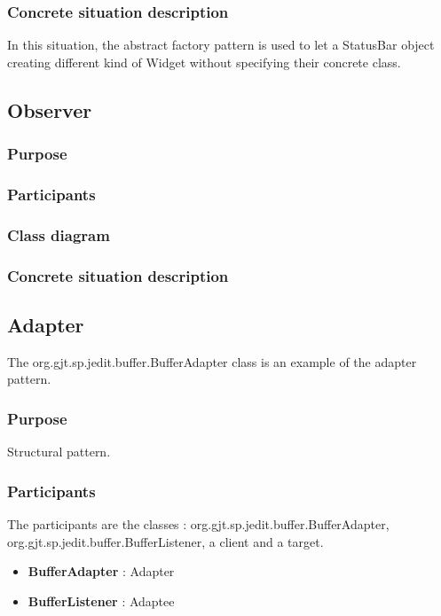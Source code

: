 \documentclass[a4paper,10pt]{article}
\begin{document}
\subsubsection{Concrete situation description}
In this situation, the abstract factory pattern is used to let a StatusBar object creating different kind of Widget without specifying their concrete class. 

\subsection{Observer}

\subsubsection{Purpose}

\subsubsection[Participants]{Participants\footnotemark[1]}

\subsubsection{Class diagram}

\subsubsection{Concrete situation description}


\subsection{Adapter}
The org.gjt.sp.jedit.buffer.BufferAdapter class is an example of the adapter pattern.

\subsubsection{Purpose}
Structural pattern.
\subsubsection[Participants]{Participants\footnotemark[1]}
The participants are the classes : org.gjt.sp.jedit.buffer.BufferAdapter, org.gjt.sp.jedit.buffer.BufferListener, a client and a target.
\begin{itemize}
 \item \textbf{BufferAdapter} : Adapter
 \item \textbf{BufferListener} : Adaptee
\end{itemize}
\end{document}
